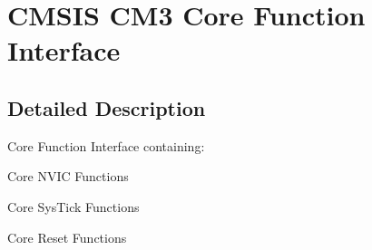 \hypertarget{group___c_m_s_i_s___c_m3___core___function_interface}{\section{C\-M\-S\-I\-S C\-M3 Core Function Interface}
\label{group___c_m_s_i_s___c_m3___core___function_interface}
}


\subsection{Detailed Description}
Core Function Interface containing\-:
\begin{DoxyItemize}
\item Core N\-V\-I\-C Functions
\item Core Sys\-Tick Functions
\item Core Reset Functions 
\end{DoxyItemize}